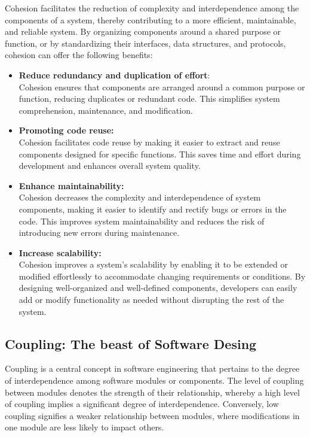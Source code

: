 Cohesion facilitates the reduction of complexity and interdependence among the components
of a system, thereby contributing to a more efficient, maintainable, and reliable system.
By organizing components around a shared purpose or function, or by standardizing their
interfaces, data structures, and protocols, cohesion can offer the following benefits:

\begin{itemize}
    \item \textbf{Reduce redundancy and duplication of effort}: \\
    Cohesion ensures that components are arranged around a common purpose or function,
    reducing duplicates or redundant code. This simplifies system comprehension,
    maintenance, and modification.
    \item \textbf{Promoting code reuse:}\\
    Cohesion facilitates code reuse by making it easier to extract and reuse components
    designed for specific functions. This saves time and effort during development and
    enhances overall system quality.
    \item \textbf{Enhance maintainability:}\\
    Cohesion decreases the complexity and interdependence of system components, making it
    easier to identify and rectify bugs or errors in the code. This improves system
    maintainability and reduces the risk of introducing new errors during maintenance.
    \item \textbf{Increase scalability:}\\
    Cohesion improves a system's scalability by enabling it to be extended or modified
    effortlessly to accommodate changing requirements or conditions. By designing
    well-organized and well-defined components, developers can easily add or modify
    functionality as needed without disrupting the rest of the system.  
\end{itemize}

\subsection{Coupling: The beast of Software Desing} \label{subsec:on_coupling}

Coupling is a central concept in software engineering that pertains to the degree of
interdependence among software modules or components. The level of coupling between
modules denotes the strength of their relationship, whereby a high level of coupling
implies a significant degree of interdependence. Conversely, low coupling signifies a
weaker relationship between modules, where modifications in one module are less likely to
impact others.

